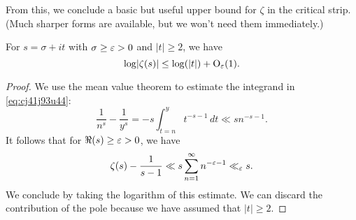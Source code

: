 \documentclass[reqno]{amsart}  \numberwithin{theorem}{section} \numberwithin{equation}{section}
\begin{document}
From this, we conclude a basic but useful upper bound for $\zeta$ in the critical strip.  (Much sharper forms are available, but we won't need them immediately.)
\begin{lemma}
  For $s = \sigma + it $ with $\sigma \geq \varepsilon > 0$ and $\lvert t \rvert \geq 2$, we have
  \begin{equation}\label{eq:cj41kdcbj7}
\log \lvert \zeta(s) \rvert \leq \log (\lvert t \rvert) + \operatorname{O}_{\varepsilon}(1).
  \end{equation}
\end{lemma}
\begin{proof}
  We use the mean value theorem to estimate the integrand in \eqref{eq:cj41j93u44}:
  \begin{equation*}
    \frac{1}{n^s }  - \frac{1}{y^s}
    = - s \int_{t = n}^y t^{-s - 1} \, d t
    \ll s n^{-s - 1}.
  \end{equation*}
  It follows that for $\Re(s) \geq \varepsilon > 0$, we have
  \begin{equation*}
    \zeta(s) - \frac{1}{s - 1}
    \ll s \sum_{n = 1}^\infty n^{-\varepsilon - 1}
    \ll_\varepsilon s.
  \end{equation*}
  We conclude by taking the logarithm of this estimate.  We can discard the contribution of the pole because we have assumed that $\lvert t \rvert \geq 2$.
\end{proof}
\end{document}
